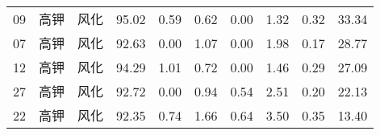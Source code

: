 \documentclass[withoutpreface,bwprint]{cumcmthesis} %
\begin{document}
\begin{appendices}
\begin{table}[!h]
\begin{tabular}{@{}cccccccccc@{}}
		09                                                        & 高钾          & 风化                                                       & 95.02                                                          & 0.59                                                         & 0.62                                                         & 0.00                                                         & 1.32                                                           & 0.32                                                           & 33.34                                                           \\
		07                                                        & 高钾          & 风化                                                       & 92.63                                                          & 0.00                                                         & 1.07                                                         & 0.00                                                         & 1.98                                                           & 0.17                                                           & 28.77                                                           \\
		12                                                        & 高钾          & 风化                                                       & 94.29                                                          & 1.01                                                         & 0.72                                                         & 0.00                                                         & 1.46                                                           & 0.29                                                           & 27.09                                                           \\
		27                                                        & 高钾          & 风化                                                       & 92.72                                                          & 0.00                                                         & 0.94                                                         & 0.54                                                         & 2.51                                                           & 0.20                                                           & 22.13                                                           \\
		22                                                        & 高钾          & 风化                                                       & 92.35                                                          & 0.74                                                         & 1.66                                                         & 0.64                                                         & 3.50                                                           & 0.35                                                           & 13.40                                                           \\

\end{tabular}
\end{table}
\end{appendices}
\end{document}
